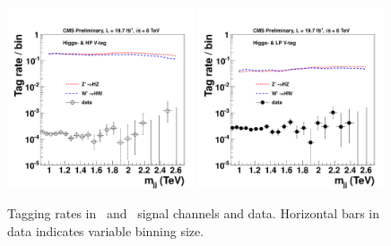 \begin{figure}[htb]
\begin{center}
\includegraphics[width=0.49\textwidth]{EXO-14-009/HbbZqqfigs/Signal/HbbVqq-signal-taggingEff-8TeV.pdf}
\includegraphics[width=0.49\textwidth]{EXO-14-009/HbbZqqfigs/Signal/HbbVqq-signal-taggingEff-LowV-8TeV.pdf}
\end{center}
\caption{
Tagging rates in \HbbZqq\ and \HbbWqq\ signal channels and data. Horizontal bars
in data indicates variable binning size.
}
\label{fig:HbbZqqOverallEff}
\end{figure}






